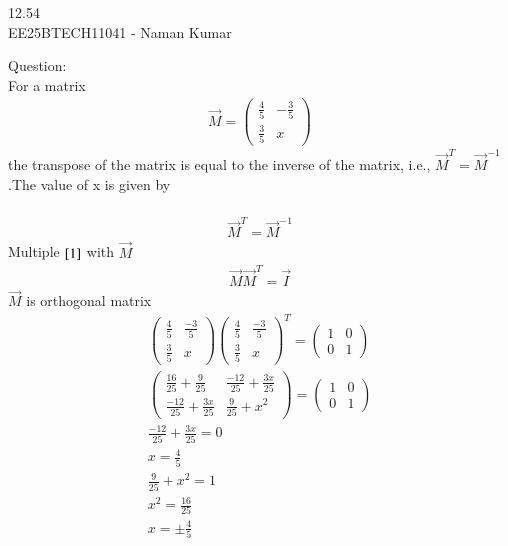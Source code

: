 \documentclass[a5paper,10pt]{article}
\author{EE25BTECH11041-Naman Kumar }
\begin{document}
\begin{center}
    \huge{12.54}\\
    \large{EE25BTECH11041 - Naman Kumar}
\end{center}
Question:\\
For a matrix
\begin{align}
    \vec{M}=\begin{pmatrix}
        \frac{4}{5} & -\frac{3}{5} \\\frac{3}{5} & x
    \end{pmatrix}
\end{align}
the transpose of the matrix is equal to the inverse of the matrix, i.e., $\vec{M}^T=\vec{M}^{-1}$.The value of x is given by\\
\solution \\
\begin{align}
    \vec{M}^T=\vec{M}^{-1} \label{1}
\end{align}
Multiple $\eqref{1}$ with $\vec{M}$
\begin{align}
    \vec{M}\vec{M}^T=\vec{I}
\end{align}
$\vec{M}$  is orthogonal matrix
\begin{align}
\begin{pmatrix}\frac{4}{5} & \frac{-3}{5} \\ \frac{3}{5} & x\end{pmatrix}\begin{pmatrix}\frac{4}{5} & \frac{-3}{5} \\ \frac{3}{5} & x\end{pmatrix}^T=\begin{pmatrix}1&0\\0&1\end{pmatrix}\\
\begin{pmatrix}\frac{16}{25}+ \frac{9}{25} & \frac{-12}{25}+\frac{3x}{25} \\ \frac{-12}{25} +\frac{3x}{25} & \frac{9}{25}+x^2\end{pmatrix}=\begin{pmatrix}1&0\\0&1\end{pmatrix}\\
\frac{-12}{25}+\frac{3x}{25}=0\\
x=\frac{4}{5} \label{2} \\ 
\frac{9}{25}+x^2=1\\
x^2=\frac{16}{25}\\
x=\pm \frac{4}{5} \label{3}
\end{align}
\end{document}
